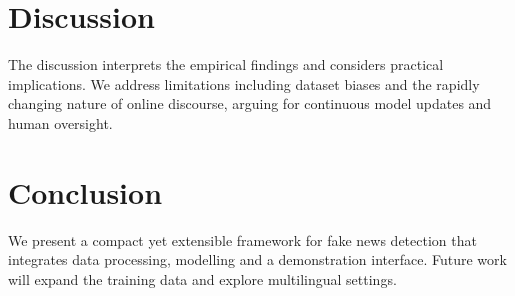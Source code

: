 \documentclass{report}
\begin{document}
\chapter{Discussion}
The discussion interprets the empirical findings and considers practical
implications.  We address limitations including dataset biases and the rapidly
changing nature of online discourse, arguing for continuous model updates and
human oversight.

\chapter{Conclusion}
We present a compact yet extensible framework for fake news detection that
integrates data processing, modelling and a demonstration interface.  Future
work will expand the training data and explore multilingual settings.



\end{document}
